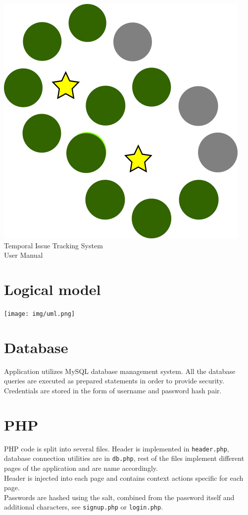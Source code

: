\documentclass{article}
\begin{document}
\vfill
\begin{center}
    \includegraphics[scale=0.12]{../img/favicon.png}\\
{\huge Temporal Issue Tracking System\\}
{\Large User Manual}
\end{center}
\vfill
\newpage
\tableofcontents
\newpage
\setcounter{page}{3}
\section{Logical model}
\texttt{[image: img/uml.png]}
\section{Database}
Application utilizes MySQL database management system. All the database queries are executed as prepared statements in order to provide security. Credentials are stored in the form of username and password hash pair.
\section{PHP}
PHP code is split into several files. Header is implemented in \texttt{header.php}, database connection utilities are in \texttt{db.php}, rest of the files implement different pages of the application and are name accordingly.\\
Header is injected into each page and contains context actions specific for each page.\\
Passwords are hashed using the salt, combined from the password itself and additional characters, see \texttt{signup.php} or \texttt{login.php}.
\end{document}
